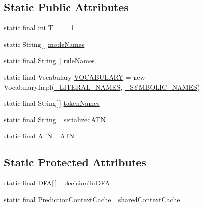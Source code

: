 \subsection*{Static Public Attributes}
\begin{DoxyCompactItemize}
\item 
static final int \hyperlink{classgov_1_1nasa_1_1jpf_1_1inspector_1_1server_1_1expression_1_1parser_1_1_expression_grammar_lexer_aecb0738435afec0b6586f20e4e9e5b5d}{T\+\_\+\+\_} =1
\item 
static String\mbox{[}$\,$\mbox{]} \hyperlink{classgov_1_1nasa_1_1jpf_1_1inspector_1_1server_1_1expression_1_1parser_1_1_expression_grammar_lexer_adc91f9c13886a851dd54563b3bbeece1}{mode\+Names}
\item 
static final String\mbox{[}$\,$\mbox{]} \hyperlink{classgov_1_1nasa_1_1jpf_1_1inspector_1_1server_1_1expression_1_1parser_1_1_expression_grammar_lexer_a3ec804a7b56097656ced7d4276b0d6b2}{rule\+Names}
\item 
static final Vocabulary \hyperlink{classgov_1_1nasa_1_1jpf_1_1inspector_1_1server_1_1expression_1_1parser_1_1_expression_grammar_lexer_a1fb932a63a8d524fa329e6afca465138}{V\+O\+C\+A\+B\+U\+L\+A\+RY} = new Vocabulary\+Impl(\hyperlink{classgov_1_1nasa_1_1jpf_1_1inspector_1_1server_1_1expression_1_1parser_1_1_expression_grammar_lexer_a48bbb62b6d539fe539cab97c828b27e6}{\+\_\+\+L\+I\+T\+E\+R\+A\+L\+\_\+\+N\+A\+M\+ES}, \hyperlink{classgov_1_1nasa_1_1jpf_1_1inspector_1_1server_1_1expression_1_1parser_1_1_expression_grammar_lexer_ae981a3758a3e07d16031e52e5b7356ec}{\+\_\+\+S\+Y\+M\+B\+O\+L\+I\+C\+\_\+\+N\+A\+M\+ES})
\item 
static final String\mbox{[}$\,$\mbox{]} \hyperlink{classgov_1_1nasa_1_1jpf_1_1inspector_1_1server_1_1expression_1_1parser_1_1_expression_grammar_lexer_a550f651cc1875a281edf827da78e54e1}{token\+Names}
\item 
static final String \hyperlink{classgov_1_1nasa_1_1jpf_1_1inspector_1_1server_1_1expression_1_1parser_1_1_expression_grammar_lexer_ae46ea6995c32b4f2babb38ae606c04e9}{\+\_\+serialized\+A\+TN}
\item 
static final A\+TN \hyperlink{classgov_1_1nasa_1_1jpf_1_1inspector_1_1server_1_1expression_1_1parser_1_1_expression_grammar_lexer_a01682bbb89e1c13f1f5df9764056ae9a}{\+\_\+\+A\+TN}
\end{DoxyCompactItemize}
\subsection*{Static Protected Attributes}
\begin{DoxyCompactItemize}
\item 
static final D\+FA\mbox{[}$\,$\mbox{]} \hyperlink{classgov_1_1nasa_1_1jpf_1_1inspector_1_1server_1_1expression_1_1parser_1_1_expression_grammar_lexer_a9e313cfd9e7a77d4944605bb18645406}{\+\_\+decision\+To\+D\+FA}
\item 
static final Prediction\+Context\+Cache \hyperlink{classgov_1_1nasa_1_1jpf_1_1inspector_1_1server_1_1expression_1_1parser_1_1_expression_grammar_lexer_ab75d7f99c3c809d7d651d17e6b8a8ac7}{\+\_\+shared\+Context\+Cache}
\end{DoxyCompactItemize}

